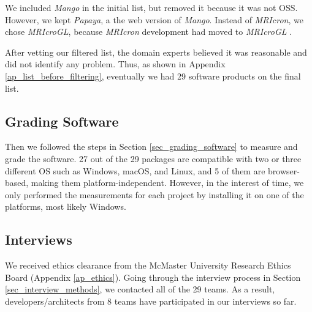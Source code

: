 We included \textit{Mango} in the initial list, but removed it because it was not OSS. However, we kept \textit{Papaya}, a the web version of \textit{Mango}. Instead of \textit{MRIcron}, we chose \textit{MRIcroGL}, because \textit{MRIcron} development had moved to
\textit{MRIcroGL} \cite{Rorden2021b}.

After vetting our filtered list, the domain experts believed it was reasonable and did not identify any problem. Thus, as shown in Appendix \ref{ap_list_before_filtering}, eventually we had 29 software products on the final list. 

\subsection{Grading Software}
Then we followed the steps in Section \ref{sec_grading_software} to measure and grade the software. 27 out of the 29 packages are compatible with two or three different OS such as Windows, macOS, and Linux, and 5 of them are browser-based, making them platform-independent. However, in the interest of time, we only performed the measurements for each project by installing it on one of the platforms, most likely Windows.

\subsection{Interviews}
We received ethics clearance from the McMaster University Research Ethics Board (Appendix \ref{ap_ethics}). Going through the interview process in Section \ref{sec_interview_methods}, we contacted all of the 29 teams. As a result, developers/architects from 8 teams have participated in our interviews so far.
